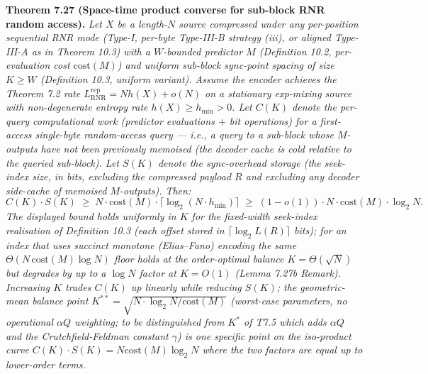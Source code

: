 \documentclass[
]{article}
\begin{document}
\textbf{Theorem 7.27 (Space-time product converse for sub-block
RNR random access).} \emph{Let $X$ be a length-$N$ source compressed
under any per-position sequential RNR mode (Type-I, per-byte
Type-III-B strategy (iii), or aligned Type-III-A as in
Theorem 10.3) with a $W$-bounded predictor $M$ (Definition 10.2,
per-evaluation cost $\mathrm{cost}(M)$) and uniform sub-block
sync-point spacing of size $K \geq W$ (Definition 10.3, uniform
variant). Assume the encoder achieves the Theorem 7.2 rate
$L^{\mathrm{rep}}_{\mathrm{RNR}} = N h(X) + o(N)$ on a stationary
exp-mixing source with non-degenerate entropy rate
$h(X) \geq h_{\min} > 0$. Let $C(K)$ denote the per-query
computational work (predictor evaluations $+$ bit operations) for a
\emph{first-access} single-byte random-access query --- i.e., a query
to a sub-block whose $M$-outputs have not been previously memoised
(the decoder cache is cold relative to the queried sub-block). Let
$S(K)$ denote the sync-overhead storage (the seek-index size, in bits,
excluding the compressed payload $R$ and excluding any decoder
side-cache of memoised $M$-outputs). Then:}
\[
  C(K) \cdot S(K) \;\geq\; N \cdot \mathrm{cost}(M) \cdot
  \bigl\lceil \log_2(N \cdot h_{\min}) \bigr\rceil
  \;\geq\; (1 - o(1)) \cdot N \cdot \mathrm{cost}(M) \cdot \log_2 N.
\]
\emph{The displayed bound holds uniformly in $K$ for the fixed-width
seek-index realisation of Definition 10.3 (each offset stored in
$\lceil\log_2 L(R)\rceil$ bits); for an index that uses succinct
monotone (Elias--Fano) encoding the same $\Theta(N\,\mathrm{cost}(M)
\log N)$ floor holds at the order-optimal balance $K=\Theta(\sqrt N)$
but degrades by up to a $\log N$ factor at $K=O(1)$ (Lemma 7.27b
Remark). Increasing $K$ trades $C(K)$ up linearly while reducing
$S(K)$; the geometric-mean balance point $K^{**} = \sqrt{N \cdot
\log_2 N / \mathrm{cost}(M)}$ (worst-case parameters, no operational
$\alpha Q$ weighting; to be distinguished from $K^*$ of T7.5 which
adds $\alpha Q$ and the Crutchfield-Feldman constant $\gamma$) is
one specific point on the iso-product curve
$C(K) \cdot S(K) = N \mathrm{cost}(M) \log_2 N$ where the two factors
are equal up to lower-order terms.}
\end{document}
